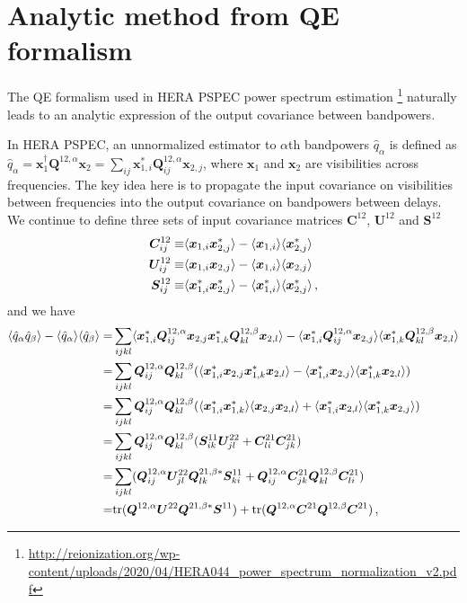 \documentclass[12pt,a4paper]{article}
\begin{document}
\section{Analytic method from QE formalism}
\label{ap:analytic}
The QE formalism used in HERA PSPEC power spectrum estimation \footnote{\url{http://reionization.org/wp-content/uploads/2020/04/HERA044_power_spectrum_normalization_v2.pdf}} naturally leads to an analytic expression of the output covariance between bandpowers. 

In HERA PSPEC, an unnormalized estimator to $\alpha$th bandpowers $\hat{q}_\alpha$ is defined as $\hat{q}_\alpha = \bm{x}_1^\dagger \bm{Q}^{12,\alpha} \bm{x}_2 = \sum_{ij} \bm{x}_{1,i}^*\bm{Q}^{12,\alpha}_{ij}\bm{x}_{2,j}$, where $\bm{x}_{1}$ and $\bm{x}_{2}$ are visibilities across frequencies. The key idea here is to propagate the input covariance on visibilities between frequencies into the output covariance on bandpowers between delays. We continue to define three sets of input covariance matrices $\bm{C}^{12}$, $\bm{U}^{12}$ and $\bm{S}^{12}$
\begin{align}
\bm{C}^{12}_{ij} \equiv & \langle \bm{x}_{1,i} \bm{x}_{2,j}^* \rangle - \langle \bm{x}_{1,i} \rangle \langle \bm{x}_{2,j}^*\rangle \notag\\
\bm{U}^{12}_{ij} \equiv & \langle \bm{x}_{1,i} \bm{x}_{2,j}\rangle - \langle \bm{x}_{1,i}\rangle\langle \bm{x}_{2,j}\rangle \notag \\
\bm{S}^{12}_{ij} \equiv & \langle \bm{x}_{1,i}^* \bm{x}_{2,j}^*\rangle - \langle \bm{x}_{1,i}^*\rangle \langle \bm{x}_{2,j}^*\rangle \,,
\end{align}
and we have
\begin{align}
\langle \hat{q}_\alpha \hat{q}_\beta \rangle - \langle \hat{q}_\alpha \rangle\langle \hat{q}_\beta\rangle =& 
\sum_{ijkl}\langle \bm{x}_{1,i}^*\bm{Q}^{12,\alpha}_{ij}\bm{x}_{2,j}\bm{x}_{1,k}^*\bm{Q}^{12,\beta}_{kl}\bm{x}_{2,l}\rangle - \langle \bm{x}_{1,i}^*\bm{Q}^{12,\alpha}_{ij}\bm{x}_{2,j}\rangle\langle \bm{x}_{1,k}^*\bm{Q}^{12,\beta}_{kl}\bm{x}_{2,l}\rangle\notag\\
=&\sum_{ijkl}\bm{Q}^{12,\alpha}_{ij}\bm{Q}^{12,\beta}_{kl}(\langle \bm{x}_{1,i}^*\bm{x}_{2,j}\bm{x}_{1,k}^*\bm{x}_{2,l}\rangle - \langle \bm{x}_{1,i}^*\bm{x}_{2,j}\rangle\langle \bm{x}_{1,k}^*\bm{x}_{2,l}\rangle)\notag\\
=&\sum_{ijkl}\bm{Q}^{12,\alpha}_{ij}\bm{Q}^{12,\beta}_{kl}(\langle \bm{x}_{1,i}^*\bm{x}_{1,k}^*\rangle\langle \bm{x}_{2,j}\bm{x}_{2,l}\rangle + \langle \bm{x}_{1,i}^*\bm{x}_{2,l}\rangle \langle \bm{x}_{1,k}^*\bm{x}_{2,j}\rangle)\notag\\
=&\sum_{ijkl}\bm{Q}^{12,\alpha}_{ij}\bm{Q}^{12,\beta}_{kl} (\bm{S}_{ik}^{11}\bm{U}_{jl}^{22} + \bm{C}^{21}_{li}\bm{C}^{21}_{jk})\notag\\
=&\sum_{ijkl}( \bm{Q}^{12,\alpha}_{ij}\bm{U}_{jl}^{22}\bm{Q}^{21,\beta*}_{lk} \bm{S}_{ki}^{11} + \bm{Q}^{12,\alpha}_{ij}\bm{C}^{21}_{jk} \bm{Q}^{12,\beta}_{kl} \bm{C}^{21}_{li} ) \notag\\
=&\text{tr}(\bm{Q}^{12,\alpha} \bm{U}^{22} \bm{Q}^{21,\beta*} \bm{S}^{11}) + \text{tr}(\bm{Q}^{12,\alpha} \bm{C}^{21} \bm{Q}^{12,\beta} \bm{C}^{21}) \,,
\end{align}
\end{document}
